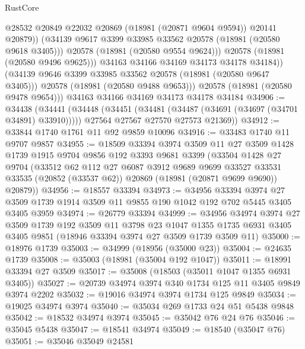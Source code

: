 \begin{lexlean}{RustCore}
\begin{coremodule}
                    @28532
                    @20849
                    @22032
                    @20869
                    (@18981 (@20871 @9604 @9594))
                    @20141
                    @20879))
                (@34139 @9617 @3399 @33985 @33562 @20578 (@18981 (@20580 @9618 @3405)))
                @20578
                (@18981 (@20580 @9554 @9624)))
              @20578
              (@18981 (@20580 @9496 @9625)))
            @34163
            @34166
            @34169
            @34173
            @34178
            @34184))
        (@34139 @9646 @3399 @33985 @33562 @20578 (@18981 (@20580 @9647 @3405)))
        @20578
        (@18981 (@20580 @9488 @9653)))
      @20578
      (@18981 (@20580 @9478 @9654)))
    @34163
    @34166
    @34169
    @34173
    @34178
    @34184
@34906 := @34438
    (@34441
      (@34448
        (@34451 (@34481 (@34487 (@34691 (@34697 (@34701 @34891) @33910)))))
        @27564
        @27567
        @27570
        @27573
        @21369))
@34912 := @33844 @1740 @1761 @11 @92 @9859 @10096
@34916 := @33483 @1740 @11 @9707 @9857
@34955 := @18509
    @33394
    @3974
    @3509
    @11
    @27
    @3509
    @1428
    @1739
    @1915
    @9704
    @9856
    @192
    @3393
    @9681
    @3399
    (@33504
      @1428
      @27
      @9704
      (@33512
        @62
        @112
        @27
        @6087
        @3912
        @9689
        @9699
        @33527
        @33531
        @33535
        (@20852 (@33537 @62))
        @20869
        (@18981 (@20871 @9699 @9690))
        @20879))
@34956 := @18557 @33394
@34973 := @34956
    @33394
    @3974
    @27
    @3509
    @1739
    @1914
    @3509
    @11
    @9855
    @190
    @1042
    @192
    @702
    @5445
    @3405
    @3405
    @3959
@34974 := @26779 @33394
@34999 := @34956
    @34974
    @3974
    @27
    @3509
    @1739
    @192
    @3509
    @11
    @3798
    @23
    @1047
    @1355
    @1735
    @6931
    @3405
    @3405
    @9851
    (@18946 @33394 @3974 @27 @3509 @1739 @3509 @11)
@35000 := @18976 @1739
@35003 := @34999 (@18956 (@35000 @23))
@35004 := @24635 @1739
@35008 := @35003 (@18981 (@35004 @192 @1047))
@35011 := @18991 @33394 @27 @3509
@35017 := @35008 (@18503 (@35011 @1047 @1355 @6931 @3405))
@35027 := @20739 @34974 @3974 @340 @1734 @125 @11 @3405 @9849 @3974 @2202
@35032 := @19016 @34974 @3974 @1734 @125 @9849
@35034 := @19025 @34974 @3974
@35040 := @35034 @269 @1733 @24 @51 @5438 @9848
@35042 := @18532 @34974 @3974
@35045 := @35042 @76 @24 @76
@35046 := @35045 @5438
@35047 := @18541 @34974
@35049 := @18540 (@35047 @76)
@35051 := @35046 @35049 @24581

\end{coremodule}
\end{lexlean}
